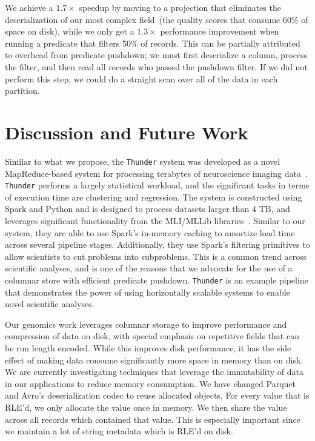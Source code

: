 \documentclass{acm_proc_article-sp}
\begin{document}
We achieve a $1.7\times$ speedup by moving to a projection that eliminates the deserialization of our most
complex field~(the quality scores that consume 60\% of space on disk), while we only get a $1.3\times$
performance improvement when running a predicate that filters 50\% of records. This can be partially attributed
to overhead from predicate pushdown; we must first deserialize a column, process the filter, and then read all
records who passed the pushdown filter. If we did not perform this step, we could do a straight scan over all of
the data in each partition.

\section{Discussion and Future Work}
\label{sec:discussion-future-work}

Similar to what we propose, the \texttt{Thunder} system was developed as a novel MapReduce-based system for
processing terabytes of neuroscience imaging data~\cite{freeman14}. \texttt{Thunder} performs a largely statistical
workload, and the significant tasks in terms of execution time are clustering and regression. The system is
constructed using Spark and Python and is designed to process datasets larger than 4 TB, and leverages
significant functionality from the MLI/MLLib libraries~\cite{sparks13}. Similar to our system, they are able to use
Spark's in-memory caching to amortize load time across several pipeline stages. Additionally, they use Spark's
filtering primitives to allow scientists to cut problems into subproblems. This is a common trend across scientific
analyses, and is one of the reasons that we advocate for the use of a columnar store with efficient predicate
pushdown. \texttt{Thunder} is an example pipeline that demonstrates the power of using horizontally scalable
systems to enable novel scientific analyses.

Our genomics work leverages columnar storage to improve performance and compression of data on disk,
with special emphasis on repetitive fields that can be run length encoded. While this improves
disk performance, it has the side effect of making data consume significantly more space in memory
than on disk. We are currently investigating techniques that leverage the immutability of data in our
applications to reduce memory consumption. We have changed Parquet and Avro's deserialization codec
to reuse allocated objects. For every value that is RLE'd, we only allocate the value once in memory. We
then share the value across all records which contained that value. This is especially important since we
maintain a lot of string metadata which is RLE'd on disk.
\end{document}
